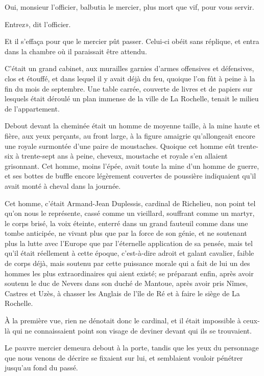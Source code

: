 \speak  Oui, monsieur l'officier, balbutia le mercier, plus mort que vif, pour vous servir. 

\speak  Entrez», dit l'officier. 

Et il s'effaça pour que le mercier pût passer. Celui-ci obéit sans réplique, et entra dans la chambre où il paraissait être attendu. 

C'était un grand cabinet, aux murailles garnies d'armes offensives et défensives, clos et étouffé, et dans lequel il y avait déjà du feu, quoique l'on fût à peine à la fin du mois de septembre. Une table carrée, couverte de livres et de papiers sur lesquels était déroulé un plan immense de la ville de La Rochelle, tenait le milieu de l'appartement. 

Debout devant la cheminée était un homme de moyenne taille, à la mine haute et fière, aux yeux perçants, au front large, à la figure amaigrie qu'allongeait encore une royale surmontée d'une paire de moustaches. Quoique cet homme eût trente-six à trente-sept ans à peine, cheveux, moustache et royale s'en allaient grisonnant. Cet homme, moins l'épée, avait toute la mine d'un homme de guerre, et ses bottes de buffle encore légèrement couvertes de poussière indiquaient qu'il avait monté à cheval dans la journée. 

Cet homme, c'était Armand-Jean Duplessis, cardinal de Richelieu, non point tel qu'on nous le représente, cassé comme un vieillard, souffrant comme un martyr, le corps brisé, la voix éteinte, enterré dans un grand fauteuil comme dans une tombe anticipée, ne vivant plus que par la force de son génie, et ne soutenant plus la lutte avec l'Europe que par l'éternelle application de sa pensée, mais tel qu'il était réellement à cette époque, c'est-à-dire adroit et galant cavalier, faible de corps déjà, mais soutenu par cette puissance morale qui a fait de lui un des hommes les plus extraordinaires qui aient existé; se préparant enfin, après avoir soutenu le duc de Nevers dans son duché de Mantoue, après avoir pris Nîmes, Castres et Uzès, à chasser les Anglais de l'île de Ré et à faire le siège de La Rochelle. 

À la première vue, rien ne dénotait donc le cardinal, et il était impossible à ceux-là qui ne connaissaient point son visage de deviner devant qui ils se trouvaient. 

Le pauvre mercier demeura debout à la porte, tandis que les yeux du personnage que nous venons de décrire se fixaient sur lui, et semblaient vouloir pénétrer jusqu'au fond du passé. 

